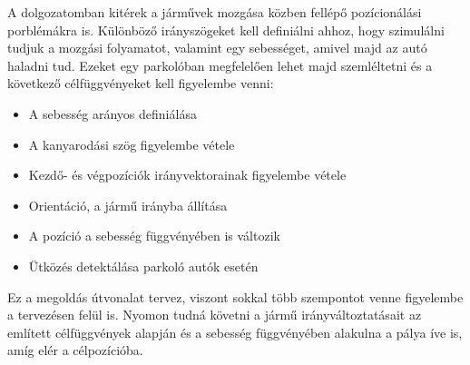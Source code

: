 
A dolgozatomban kitérek a járművek mozgása közben fellépő pozícionálási porblémákra is. Különböző irányszögeket kell definiálni ahhoz, hogy szimulálni tudjuk a mozgási folyamatot, valamint egy sebességet, amivel majd az autó haladni tud. Ezeket egy parkolóban megfelelően lehet majd szemléltetni és a következő célfüggvényeket kell figyelembe venni:
\begin{itemize}
	\item A sebesség arányos definiálása
	\item A kanyarodási szög figyelembe vétele
	\item Kezdő- és végpozíciók irányvektorainak figyelembe vétele
	\item Orientáció, a jármű irányba állítása
	\item A pozíció a sebesség függvényében is változik
	\item Ütközés detektálása parkoló autók esetén
\end{itemize}

Ez a megoldás útvonalat tervez, viszont sokkal több szempontot venne figyelembe a tervezésen felül is. Nyomon tudná követni a jármű irányváltoztatásait az említett célfüggvények alapján és a sebesség függvényében alakulna a pálya íve is, amíg elér a célpozícióba.




